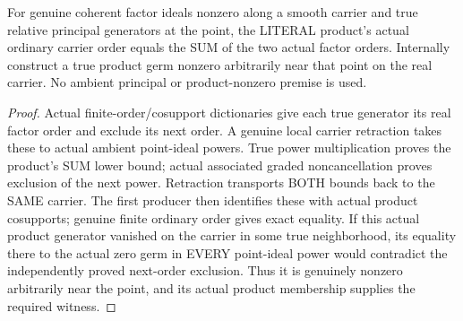 \begin{theorem}
\label{hir:sharp-actual-relative-product-order-additivity-nonzero}
\leanok
For genuine coherent factor ideals nonzero along a smooth carrier and true
relative principal generators at the point, the LITERAL product's actual
ordinary carrier order equals the SUM of the two actual factor orders.
Internally construct a true product germ nonzero arbitrarily near that
point on the real carrier. No ambient principal or product-nonzero premise
is used.
\end{theorem}
\begin{proof}
Actual finite-order/cosupport dictionaries give each true generator its
real factor order and exclude its next order. A genuine local carrier
retraction takes these to actual ambient point-ideal powers. True power
multiplication proves the product's SUM lower bound; actual associated
graded noncancellation proves exclusion of the next power. Retraction
transports BOTH bounds back to the SAME carrier. The first producer then
identifies these with actual product cosupports; genuine finite ordinary
order gives exact equality. If this actual product generator vanished on
the carrier in some true neighborhood, its equality there to the actual
zero germ in EVERY point-ideal power would contradict the independently
proved next-order exclusion. Thus it is genuinely nonzero arbitrarily near
the point, and its actual product membership supplies the required witness.
\end{proof}

